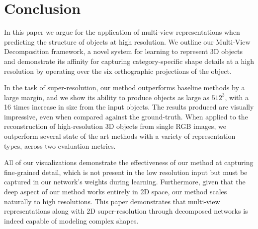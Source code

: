\documentclass{article}
\begin{document}
\section{Conclusion}

In this paper we argue for the application of multi-view representations when predicting the structure of objects at high resolution. We outline our Multi-View Decomposition framework, a novel system for learning to represent 3D objects and demonstrate its affinity for capturing category-specific shape details at a high resolution by operating over the six orthographic projections of the object. 

In the task of super-resolution, our method outperforms baseline methods by a large margin, and we show its ability to produce objects as large as $512^3$, with a 16 times increase in size from the input objects. The results produced are visually impressive, even when compared against the ground-truth. When applied to the reconstruction of high-resolution 3D objects from single RGB images, we outperform several state of the art methods with a variety of representation types, across two evaluation metrics. 

All of our visualizations demonstrate the effectiveness of our method at capturing fine-grained detail, which is not present in the low resolution input but must be captured in our network's weights during learning. Furthermore, given that the deep aspect of our method works entirely in 2D space, our method scales naturally to high resolutions. This paper demonstrates that multi-view representations along with 2D super-resolution through decomposed networks is indeed capable of modeling complex shapes. 





\end{document}
